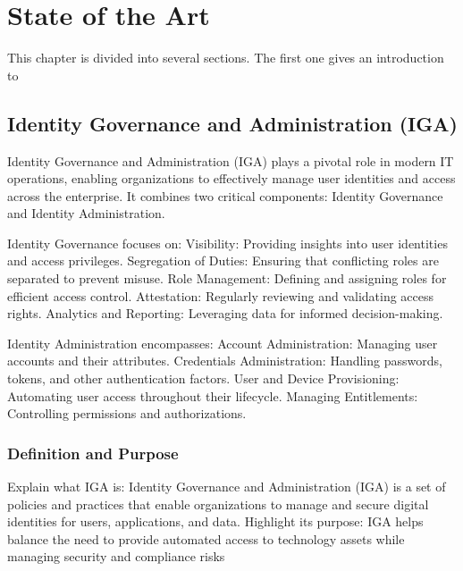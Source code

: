 
%

\chapter{State of the Art}
\label{cha:State of the Art}


This chapter is divided into several sections. The first one gives an introduction to

\section{Identity Governance and Administration (IGA)}
\label{sec:IGA}

Identity Governance and Administration (IGA) plays a pivotal role in modern IT operations, enabling organizations to effectively manage user identities and access across the enterprise. It combines two critical components: Identity Governance and Identity Administration.

    Identity Governance focuses on:
        Visibility: Providing insights into user identities and access privileges.
        Segregation of Duties: Ensuring that conflicting roles are separated to prevent misuse.
        Role Management: Defining and assigning roles for efficient access control.
        Attestation: Regularly reviewing and validating access rights.
        Analytics and Reporting: Leveraging data for informed decision-making.

    Identity Administration encompasses:
        Account Administration: Managing user accounts and their attributes.
        Credentials Administration: Handling passwords, tokens, and other authentication factors.
        User and Device Provisioning: Automating user access throughout their lifecycle.
        Managing Entitlements: Controlling permissions and authorizations.


\subsection{Definition and Purpose}
\label{sec:Template}

Explain what IGA is: Identity Governance and Administration (IGA) is a set of policies and practices that enable organizations to manage and secure digital identities for users, applications, and data. Highlight its purpose: IGA helps balance the need to provide automated access to technology assets while managing security and compliance risks

